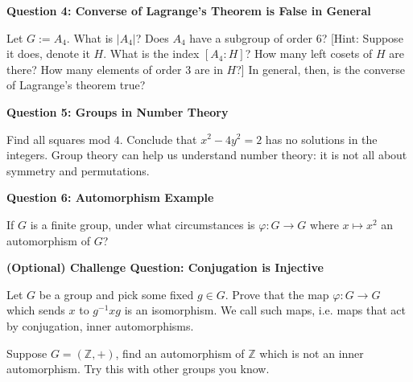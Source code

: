 \documentclass[11pt,twoside, a4paper]{report}
\theoremstyle{plain}
\theoremstyle{definition}
\begin{document}
  
\begin{center}
{\bf Question 4: Converse of Lagrange's Theorem is False in General}
\end{center}
Let $G:=A_{4}$. What is $|A_{4}|$? Does $A_{4}$ have a subgroup of order 6? [Hint: Suppose it does, denote it $H$. What is the index $[A_{4}:H]$? How many left cosets of $H$ are there? How many elements of order 3 are in $H$?] In general, then, is the converse of Lagrange's theorem true?

  


  
\begin{center}
{\bf Question 5: Groups in Number Theory}
\end{center}

Find all squares mod $4$. Conclude that $x^{2} - 4y^{2} = 2$ has no solutions in the integers. Group theory can help us understand number theory: it is not all about symmetry and permutations. 

  
\begin{center}
{\bf Question 6: Automorphism Example}
\end{center}

If $G$ is a finite group, under what circumstances is $\varphi: G \rightarrow G$ where $x\mapsto x^{2}$ an automorphism of $G$?

\begin{center}
{\bf (Optional) Challenge Question: Conjugation is Injective}
\end{center}

Let $G$ be a group and pick some fixed $g \in G$. Prove that the map $\varphi: G \rightarrow G$ which sends $x$ to $g^{-1}xg$ is an isomorphism. We call such maps, i.e. maps that act by conjugation, inner automorphisms. 

Suppose $G = (\mathbb{Z}, +)$, find an automorphism of $\mathbb{Z}$ which is not an inner automorphism. Try this with other groups you know. 
\end{document}

